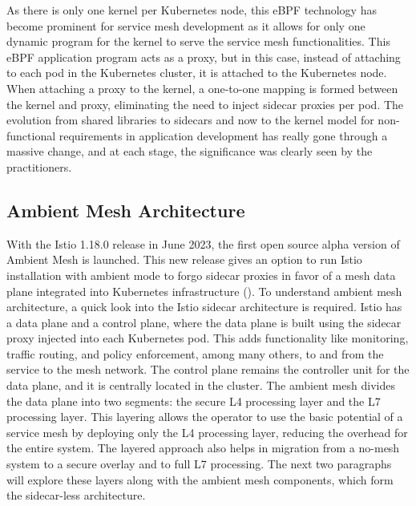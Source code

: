  As there is only one kernel per Kubernetes node, this eBPF technology has become prominent for service mesh development as it allows for only one dynamic program for the kernel to serve the service mesh functionalities. This eBPF application program acts as a proxy, but in this case, instead of attaching to each pod in the Kubernetes cluster, it is attached to the Kubernetes node. When attaching a proxy to the kernel, a one-to-one mapping is formed between the kernel and proxy, eliminating the need to inject sidecar proxies per pod. The evolution from shared libraries to sidecars and now to the kernel model for non-functional requirements in application development has really gone through a massive change, and at each stage, the significance was clearly seen by the practitioners.

\subsection{Ambient Mesh Architecture}
With the Istio 1.18.0 release in June 2023, the first open source alpha version of Ambient Mesh is launched. This new release gives an option to run Istio installation with ambient mode to forgo sidecar proxies in favor of a mesh data plane integrated into Kubernetes infrastructure (\cite{istioHoward2022}). To understand ambient mesh architecture, a quick look into the Istio sidecar architecture is required. Istio has a data plane and a control plane, where the data plane is built using the sidecar proxy injected into each Kubernetes pod. This adds functionality like monitoring, traffic routing, and policy enforcement, among many others, to and from the service to the mesh network. The control plane remains the controller unit for the data plane, and it is centrally located in the cluster. The ambient mesh divides the data plane into two segments: the secure L4 processing layer and the L7 processing layer. This layering allows the operator to use the basic potential of a service mesh by deploying only the L4 processing layer, reducing the overhead for the entire system. The layered approach also helps in migration from a no-mesh system to a secure overlay and to full L7 processing. The next two paragraphs will explore these layers along with the ambient mesh components, which form the sidecar-less architecture.

